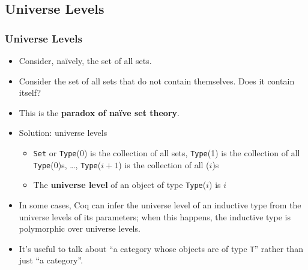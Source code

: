 \documentclass[utf8x]{beamer}
\begin{document}
  \subsection{Universe Levels}
    \begin{frame}
      \frametitle{Universe Levels }
      \begin{itemize}
        \item<1-7>
          Consider, na\"ively, the set of all sets.  
        \item<4-7>
          Consider the set of all sets that do not contain themselves.  Does it contain itself?
        \item<7->
          This is the \textbf{paradox of na\"ive set theory}.
        \item<8->
          Solution: universe levels
          \begin{itemize}
            \item<9->
              \texttt{Set} or \texttt{Type}(0) is the collection of all sets, \texttt{Type}(1) is the collection of all \texttt{Type}(0)s, \ldots, \texttt{Type}($i + 1$) is the collection of all ($i$)s
            \item<9->
              The \textbf{universe level} of an object of type \texttt{Type}($i$) is $i$
          \end{itemize}
        \item<10->
          In some cases, Coq can infer the universe level of an inductive type from the universe levels of its parameters; when this happens, the inductive type is polymorphic over universe levels.
        \item<11->
          It's useful to talk about ``a category whose objects are of type \texttt{T}'' rather than just ``a category''.
      \end{itemize}
    \end{frame}
\end{document}
